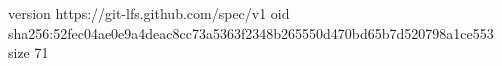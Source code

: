 version https://git-lfs.github.com/spec/v1
oid sha256:52fec04ae0e9a4deac8cc73a5363f2348b265550d470bd65b7d520798a1ce553
size 71
